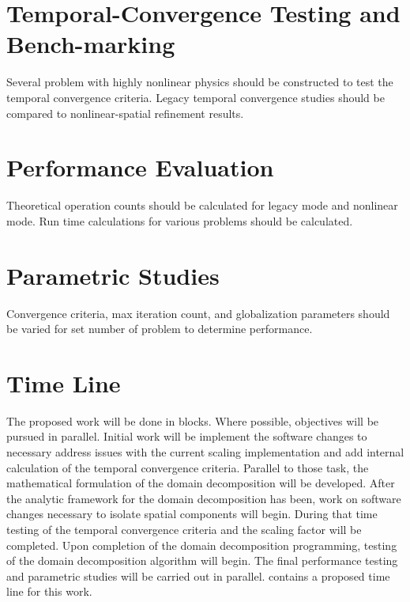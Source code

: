 \section{Temporal-Convergence Testing and Bench-marking}
\label{sect:proposal_temporal_testing}
Several problem with highly nonlinear physics should be constructed to test the temporal convergence criteria.
Legacy temporal convergence studies should be compared to nonlinear-spatial refinement results.

\section{Performance Evaluation}
\label{sect:proposal_performance_evaluation}
Theoretical operation counts should be calculated for legacy mode and nonlinear mode.
Run time calculations for various problems should be calculated.

\section{Parametric Studies}
\label{sect:proposal_parametric_studies}
Convergence criteria, max iteration count, and globalization parameters should be varied for set number of problem to determine performance.

\section{Time Line}
\label{sect:proposal_time_line}
The proposed work will be done in blocks.
Where possible, objectives will be pursued in parallel.
Initial work will be implement the software changes to necessary address issues with the current scaling implementation and add internal calculation of the temporal convergence criteria.
Parallel to those task, the mathematical formulation of the domain decomposition will be developed.
After the analytic framework for the domain decomposition has been, work on software changes necessary to isolate spatial components will begin.
During that time testing of the temporal convergence criteria and the scaling factor will be completed.
Upon completion of the domain decomposition programming, testing of the domain decomposition algorithm will begin.
The final performance testing and parametric studies will be carried out in parallel.
 contains a proposed time line for this work.

